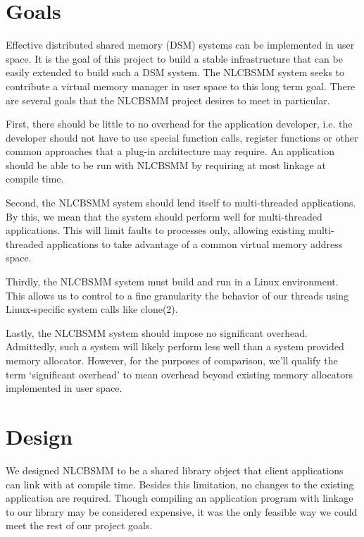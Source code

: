 \documentclass[9pt]{sig-alternate-10pt}
\begin{document}
\section{Goals}
\label{goals}

Effective distributed shared memory (DSM) systems can be implemented in user space.  It is the goal of this project to build a stable infrastructure that can be easily extended to build such a DSM system.  The NLCBSMM system seeks to contribute a virtual memory manager in user space to this long term goal.  There are several goals that the NLCBSMM project desires to meet in particular.  

First, there should be little to no overhead for the application developer, i.e. the developer should not have to use special function calls, register functions or other common approaches that a plug-in architecture may require.  An application should be able to be run with NLCBSMM by requiring at most linkage at compile time.

Second, the NLCBSMM system should lend itself to multi-threaded applications.  By this, we mean that the system should perform well for multi-threaded applications.  This will limit faults to processes only, allowing existing multi-threaded applications to take advantage of a common virtual memory address space.

Thirdly, the NLCBSMM system must build and run in a Linux environment.  This allows us to control to a fine granularity the behavior of our threads using Linux-specific system calls like clone(2).

Lastly, the NLCBSMM system should impose no significant overhead.  Admittedly, such a system will likely perform less well than a system provided memory allocator.  However, for the purposes of comparison, we'll qualify the term `significant overhead' to mean overhead beyond existing memory allocators implemented in user space.

%
%
\section{Design}
\label{design}
We designed NLCBSMM to be a shared library object that client applications can link with at compile time.  Besides this limitation, no changes to the existing application are required.  Though compiling an application program with linkage to our library may be considered expensive, it was the only feasible way we could meet the rest of our project goals.
\end{document}
